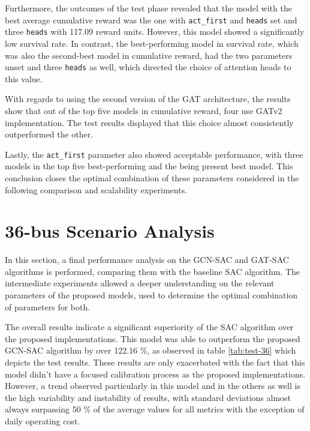Furthermore, the outcomes of the test phase revealed that the model with the best average cumulative reward was the one with \texttt{act\_first} and \texttt{heads} set and three \texttt{heads} with 117.09 reward units. However, this model showed a significantly low survival rate. In contrast, the best-performing model in survival rate, which was also the second-best model in cumulative reward, had the two parameters unset and three \texttt{heads} as well, which directed the choice of attention heads to this value.

With regards to using the second version of the \ac{GAT} architecture, the results show that out of the top five models in cumulative reward, four use GATv2 implementation. The test results displayed that this choice almost consistently outperformed the other. \par

Lastly, the \texttt{act\_first} parameter also showed acceptable performance, with three models in the top five best-performing and the being present best model. This conclusion closes the optimal combination of these parameters considered in the following comparison and scalability experiments.

\section{36-bus Scenario Analysis} \label{sec:results-gnn-comp}

In this section, a final performance analysis on the GCN-SAC and GAT-SAC algorithms is performed, comparing them with the baseline \ac{SAC} algorithm. The intermediate experiments allowed a deeper understanding on the relevant parameters of the proposed models, used to determine the optimal combination of parameters for both. \par

The overall results indicate a significant superiority of the \ac{SAC} algorithm over the proposed implementations. This model was able to outperform the proposed GCN-SAC algorithm by over 122.16 \%, as observed in table \ref{tab:test-36} which depicts the test results. These results are only exacerbated with the fact that this model didn't have a focused calibration process as the proposed implementations. However, a trend observed particularly in this model and in the others as well is the high variability and instability of results, with standard deviations almost always surpassing 50 \% of the average values for all metrics with the exception of daily operating cost. \par


